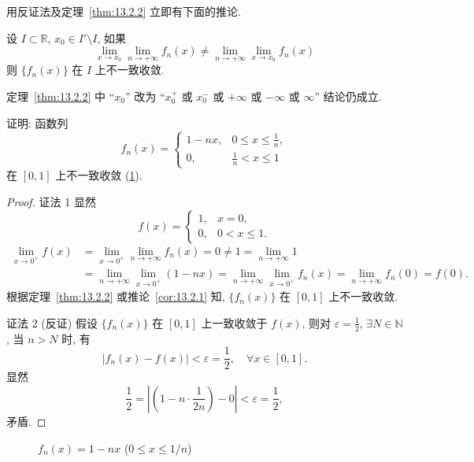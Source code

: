 用反证法及定理~\ref{thm:13.2.2} 立即有下面的推论.

\begin{corollary}\label{cor:13.2.2}
设 $I\subset\mathbb{R}$, $x_{0}\in I'\setminus I$, 如果
\[
  \lim_{x\to x_{0}}\lim_{n\to+\infty}f_{n}(x)\neq\lim_{n\to+\infty}\lim_{x\to x_{0}}f_{n}(x)
\]
则 $\{f_{n}(x)\}$ 在 $I$ 上不一致收敛.
\end{corollary}

\begin{remark}\label{rem:13.2.1}
定理~\ref{thm:13.2.2} 中 ``$x_{0}$'' 改为 ``$x_{0}^{+}$ 或 $x_{0}^{-}$ 或 $+\infty$ 或 $-\infty$ 或 $\infty$'' 结论仍成立.
\end{remark}

\begin{example}\label{ex:13.2.1}
证明: 函数列
\[
  f_{n}(x)=\begin{cases}
    1-nx, & 0\leqslant x\leqslant\frac{1}{n},\\
    0, & \frac{1}{n}<x\leqslant1
\end{cases}
\]
在 $[0,1]$ 上不一致收敛 (\cref{fig:13.2.1}).
\end{example}

\begin{proof}
证法 1 显然
\[
  f(x)=\begin{cases}
    1, & x=0,\\
    0, & 0<x\leqslant1.
\end{cases}
\]
\[
  \begin{aligned}
    \lim_{x\to0^{+}}f(x)&=\lim_{x\to0^{+}}\lim_{n\to+\infty}f_{n}(x)=0\neq1=\lim_{n\to+\infty}1\\
    &=\lim_{n\to+\infty}\lim_{x\to0^{+}}(1-nx)=\lim_{n\to+\infty}\lim_{x\to0^{+}}f_{n}(x)=\lim_{n\to+\infty}f_{n}(0)=f(0).
  \end{aligned}
\]
根据定理~\ref{thm:13.2.2} 或推论~\ref{cor:13.2.1} 知, $\{f_{n}(x)\}$ 在 $[0,1]$ 上不一致收敛.

证法 2 (反证) 假设 $\{f_{n}(x)\}$ 在 $[0,1]$ 上一致收敛于 $f(x)$, 则对 $\varepsilon=\frac{1}{2}$, $\exists N\in\mathbb{N}$, 当 $n>N$ 时, 有
\[
  |f_{n}(x)-f(x)|<\varepsilon=\frac{1}{2},\quad\forall x\in[0,1].
\]
显然
\[
  \frac{1}{2}=\left|\left(1-n\cdot\frac{1}{2n}\right)-0\right|<\varepsilon=\frac{1}{2},
\]
矛盾.
\end{proof}

\begin{figure}[htbp]
  \centering
  \caption{$f_{n}(x)=1-nx$ ($0\leqslant x\leqslant1/n$)}\label{fig:13.2.1}
\end{figure}

